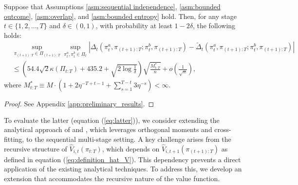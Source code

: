 \medskip
\begin{lemma}\label{lem:bound_influence_difference_function}
Suppose that Assumptions \ref{asm:sequential independence}, \ref{asm:bounded outcome}, \ref{asm:overlap}, and \ref{asm:bounded entropy} hold. Then, for any stage $t \in \{1,2,\ldots,T\}$ and $\delta \in (0,1)$, with probability at least $1-2\delta$, the following holds:
\begin{align}
    &\sup_{\pi_{(t+1):T} \in \Pi_{(t+1):T}} \sup_{\pi_{t}^{a},\pi_{t}^{b} \in \Pi_{t}} |\Delta_{t}(\pi_{t}^{a},\pi_{(t+1):T};\pi_{t}^{b},\pi_{(t+1):T}) - \widetilde{\Delta}_{t}(\pi_{t}^{a},\pi_{(t+1):T};\pi_{t}^{b},\pi_{(t+1):T})| \nonumber\\
    &\leq \left(54.4 \sqrt{2}\kappa(\Pi_{t:T}) + 435.2 + \sqrt{2 \log \frac{1}{\delta}}\right)\sqrt{\frac{M_{t:T}^{\ast}}{n}}  + o\left(\frac{1}{\sqrt{n}}\right), \label{eq:bound_influence_difference_function}
\end{align}
where $M_{t:T}^{\ast} \equiv M\cdot \left( 1 +  2\eta^{-T+t-1} + \sum_{s=1}^{T-t} 3\eta^{-s}\right) < \infty$. 
\end{lemma}

\begin{proof}
See Appendix \ref{app:preliminary_results}.
\end{proof}

\medskip

To evaluate the latter (equation (\ref{eq:latter})), we consider extending the analytical approach of \cite{Athey_Wager_2020} and \cite{zhou2022offline}, which leverages orthogonal moments and cross-fitting, to the sequential multi-stage setting. A key challenge arises from the recursive structure of  $\widehat{V}_{i,t}(\pi_{t:T})$, which depends on $\widehat{V}_{i,t+1}(\pi_{(t+1):T})$ as defined in equation (\ref{eq:definition_hat_V}). This dependency prevents a direct application of the existing analytical techniques. To address this, we develop an extension that accommodates the recursive nature of the value function. 


    
